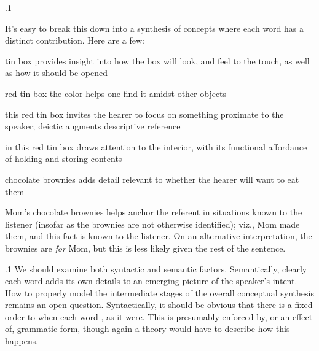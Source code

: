 \documentclass[11pt, twocolumn]{article}
\begin{document}
\p.1{%
It's easy to break this down into a synthesis of concepts where
each word has a distinct contribution.  Here are a few:

\begin{itemz}

\symItem{}   tin box \sarr{}  provides insight into how the box will look, and
feel to the touch, as well as how it should be opened
 
\symItem{}   red tin box \sarr{}  the color helps one find it amidst other objects
 
\symItem{}   this red tin box \sarr{}  invites the hearer to focus on something proximate
to the speaker; deictic augments descriptive reference
 
\symItem{}   in this red tin box \sarr{}  draws attention to the interior, with its functional
affordance of holding and storing contents
 
\symItem{}   chocolate brownies \sarr{}   adds detail relevant to whether the
hearer will want to eat them
 
\symItem{}   Mom's chocolate brownies \sarr{}  helps anchor the referent in situations
known to the listener (insofar as the brownies are not otherwise identified);
viz., Mom made them, and this fact is known to the listener.  On an alternative interpretation,
the brownies are \textit{for} Mom, but this is less likely given the rest of the sentence.

\end{itemz}

} %

\p.1{%
We should examine both syntactic and semantic factors.
Semantically, clearly each word adds its own
details to an emerging picture of the speaker's intent.
How to properly model the intermediate stages
of the overall conceptual synthesis remains an open
question.  Syntactically, it should be obvious that
there is a fixed order to when each word ,
as it were.  This is presumably enforced by, or an effect of,
grammatic form, though again a theory would have to
describe how this happens.
} %
\end{document}
